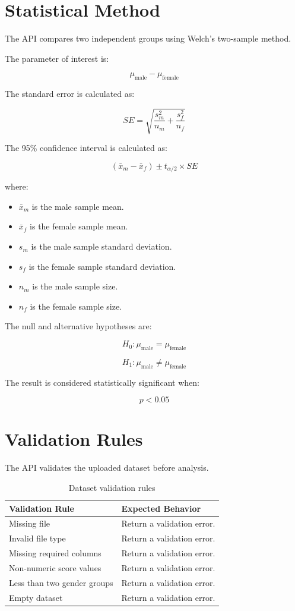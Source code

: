 \documentclass[12pt,a4paper]{article}
\begin{document}
\section{Statistical Method}

The API compares two independent groups using Welch's two-sample method.

The parameter of interest is:

\[
\mu_{\text{male}} - \mu_{\text{female}}
\]

The standard error is calculated as:

\[
SE =
\sqrt{
\frac{s_m^2}{n_m}
+
\frac{s_f^2}{n_f}
}
\]

The 95\% confidence interval is calculated as:

\[
(\bar{x}_m - \bar{x}_f)
\pm
t_{\alpha/2} \times SE
\]

where:

\begin{itemize}
    \item $\bar{x}_m$ is the male sample mean.
    \item $\bar{x}_f$ is the female sample mean.
    \item $s_m$ is the male sample standard deviation.
    \item $s_f$ is the female sample standard deviation.
    \item $n_m$ is the male sample size.
    \item $n_f$ is the female sample size.
\end{itemize}

The null and alternative hypotheses are:

\[
H_0: \mu_{\text{male}} = \mu_{\text{female}}
\]

\[
H_1: \mu_{\text{male}} \neq \mu_{\text{female}}
\]

The result is considered statistically significant when:

\[
p < 0.05
\]

\section{Validation Rules}

The API validates the uploaded dataset before analysis.

\begin{table}[h!]
\centering
\renewcommand{\arraystretch}{1.4}
\begin{tabular}{p{5cm} p{8cm}}
\toprule
\textbf{Validation Rule} & \textbf{Expected Behavior} \\
\midrule
Missing file & Return a validation error. \\
Invalid file type & Return a validation error. \\
Missing required columns & Return a validation error. \\
Non-numeric score values & Return a validation error. \\
Less than two gender groups & Return a validation error. \\
Empty dataset & Return a validation error. \\
\bottomrule
\end{tabular}
\caption{Dataset validation rules}
\end{table}
\end{document}
